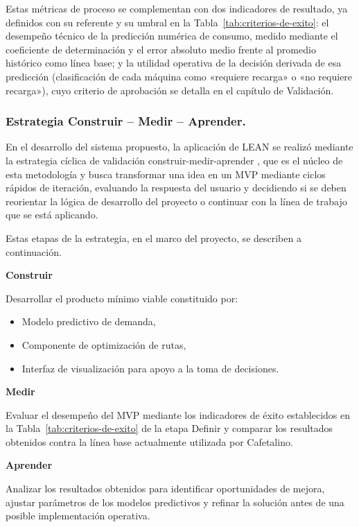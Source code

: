 Estas métricas de proceso se complementan con dos indicadores de resultado, ya definidos con su referente y su umbral en la Tabla~\ref{tab:criterios-de-exito}: el desempeño técnico de la predicción numérica de consumo, medido mediante el coeficiente de determinación y el error absoluto medio frente al promedio histórico como línea base; y la utilidad operativa de la decisión derivada de esa predicción (clasificación de cada máquina como «requiere recarga» o «no requiere recarga»), cuyo criterio de aprobación se detalla en el capítulo de Validación.

\subsubsection{Estrategia Construir -- Medir -- Aprender.}\label{estrategia-construir-medir-aprender.}

En el desarrollo del sistema propuesto, la aplicación de LEAN se realizó mediante la estrategia cíclica de validación construir-medir-aprender \citep{ries2011}, que es el núcleo de esta metodología y busca transformar una idea en un MVP mediante ciclos rápidos de iteración, evaluando la respuesta del usuario y decidiendo si se deben reorientar la lógica de desarrollo del proyecto o continuar con la línea de trabajo que se está aplicando.

Estas etapas de la estrategia, en el marco del proyecto, se describen a continuación.

\textbf{Construir}

Desarrollar el producto mínimo viable constituido por:

\begin{itemize}
\item
  Modelo predictivo de demanda,
\item
  Componente de optimización de rutas,
\item
  Interfaz de visualización para apoyo a la toma de decisiones.
\end{itemize}

\textbf{Medir}

Evaluar el desempeño del MVP mediante los indicadores de éxito establecidos en la Tabla~\ref{tab:criterios-de-exito} de la etapa Definir y comparar los resultados obtenidos contra la línea base actualmente utilizada por Cafetalino.

\textbf{Aprender}

Analizar los resultados obtenidos para identificar oportunidades de mejora, ajustar parámetros de los modelos predictivos y refinar la solución antes de una posible implementación operativa.
